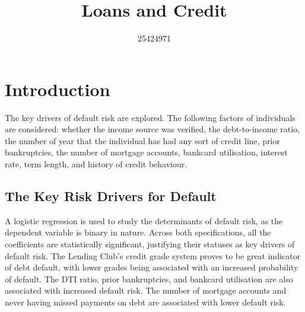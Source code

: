 \documentclass[11pt,preprint]{elsarticle}
\numberwithin{equation}{section}
\numberwithin{figure}{section}
\numberwithin{table}{section}
\begin{document}
\begin{frontmatter}  %

\title{Loans and Credit}





\author[Add1]{25424971}








\vspace{1cm}





\vspace{0.5cm}

\end{frontmatter}

\setcounter{footnote}{0}



\pagestyle{fancy}
\chead{}
\rhead{}
\lfoot{}
\lhead{}
\cfoot{}


\headsep 35pt %




\section{Introduction}\label{introduction}

The key drivers of default risk are explored. The following factors of
individuals are considered: whether the income source was verified, the
debt-to-income ratio, the number of year that the individual has had any
sort of credit line, prior bankruptcies, the number of mortgage
accounts, bankcard utilisation, interest rate, term length, and history
of credit behaviour.

\subsection{The Key Risk Drivers for
Default}\label{the-key-risk-drivers-for-default}

A logistic regression is used to study the determinants of default risk,
as the dependent variable is binary in nature. Across both
specifications, all the coefficients are statistically significant,
justifying their statuses as key drivers of default risk. The Lending
Club's credit grade system proves to be great indicator of debt default,
with lower grades being associated with an increased probability of
default. The DTI ratio, prior bankruptcies, and bankcard utilisation are
also associated with increased default risk. The number of mortgage
accounts and never having missed payments on debt are associated with
lower default risk.
\end{document}
